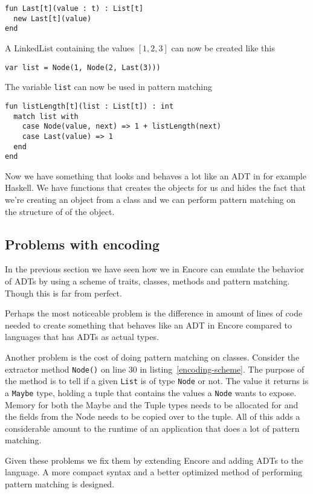 \documentclass[10pt]{report}
\def\code#1{\texttt{#1}} %
\begin{document}
{\begin{lstlisting}[language=encore,caption={Constructor functions for Node and Last}]
fun Last[t](value : t) : List[t]
  new Last[t](value)
end
\end{lstlisting}

\par{A LinkedList containing the values $[1, 2, 3]$ can now be created like this}
\begin{lstlisting}[language=encore,caption={Creation of list containing three elements}]
var list = Node(1, Node(2, Last(3)))
\end{lstlisting}

\par{The variable \code{list} can now be used in pattern matching}

\begin{lstlisting}[language=encore,caption={Function that uses pattern matching to calculate the length of a list}]
fun listLength[t](list : List[t]) : int
  match list with
    case Node(value, next) => 1 + listLength(next)
    case Last(value) => 1
  end
end
\end{lstlisting}

\par{Now we have something that looks and behaves a lot like an ADT in for example Haskell. We have functions that creates the objects for us and hides the fact that we're creating an object from a class and we can perform pattern matching on the structure of of the object.}

\subsection{Problems with encoding} \label{problems}
\par{In the previous section we have seen how we in Encore can emulate the behavior of ADTs by using a scheme of traits, classes, methods and pattern matching. Though this is far from perfect.}
\par{Perhaps the most noticeable problem is the difference in amount of lines of code needed to create something that behaves like an ADT in Encore compared to languages that has ADTs as actual types.}
\par{Another problem is the cost of doing pattern matching on classes. Consider the extractor method \code{Node()} on line 30 in listing~\ref{encoding-scheme}. The purpose of the method is to tell if a given \code{List} is of type \code{Node} or not. The value it returns is a \code{Maybe} type, holding a tuple that contains the values a \code{Node} wants to expose. Memory for both the Maybe and the Tuple types needs to be allocated for and the fields from the Node needs to be copied over to the tuple. All of this adds a considerable amount to the runtime of an application that does a lot of pattern matching.}
\par{Given these problems we fix them by extending Encore and adding ADTs to the language. A more compact syntax and a better optimized method of performing pattern matching is designed.}
}
\end{document}
